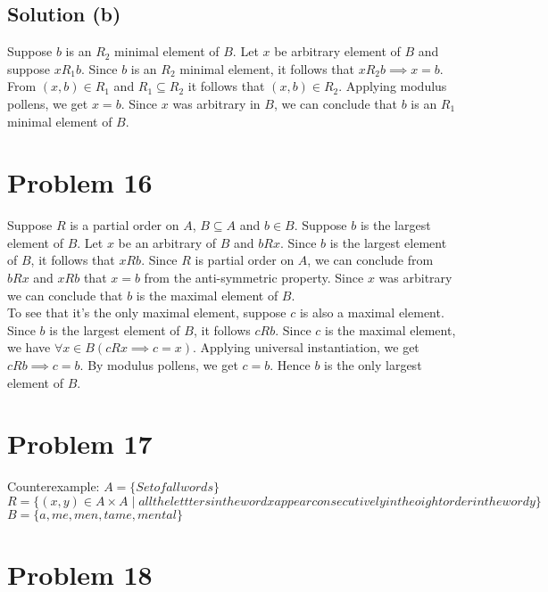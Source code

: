 \documentclass{article}
\begin{document}
\subsection{Solution (b)}
Suppose $b$ is an $R_2$ minimal element of $B$. Let $x$ be arbitrary
element of $B$ and suppose $xR_1b$. Since $b$ is an $R_2$ minimal
element, it follows that $xR_2b \implies x = b$. From $(x,b) \in R_1$
and $R_1 \subseteq R_2$ it follows that $(x,b) \in R_2$. Applying
modulus pollens, we get $x = b$. Since $x$ was arbitrary in $B$, we
can conclude that $b$ is an $R_1$ minimal element of $B$.

\section{Problem 16}
Suppose $R$ is a partial order on $A$, $B \subseteq A$ and $b \in B$.
Suppose $b$ is the largest element of $B$. Let $x$ be an arbitrary of
$B$ and $bRx$. Since $b$ is the largest element of $B$, it follows that
$xRb$. Since $R$ is partial order on $A$, we can conclude from $bRx$
and $xRb$ that $x = b$ from the anti-symmetric property. Since $x$ was
arbitrary we can conclude that $b$ is the maximal element of $B$.\\
To see that it's the only maximal element, suppose $c$ is also a
maximal element. Since $b$ is the largest element of $B$, it follows
$cRb$. Since $c$ is the maximal element, we have $\forall x \in B(cRx
\implies c = x)$. Applying universal instantiation, we get $cRb
\implies c = b$. By modulus pollens, we get $c = b$. Hence $b$ is the
only largest element of $B$.

\section{Problem 17}
Counterexample:
$A = \{Set of all words\}$ \\
$R = \{(x,y) \in A \times A \mid all the lettters in the word x appear
consecutively in the oight order in the word y\}$ \\
$B = \{a, me, men, tame, mental\}$

\section{Problem 18}
\end{document}
